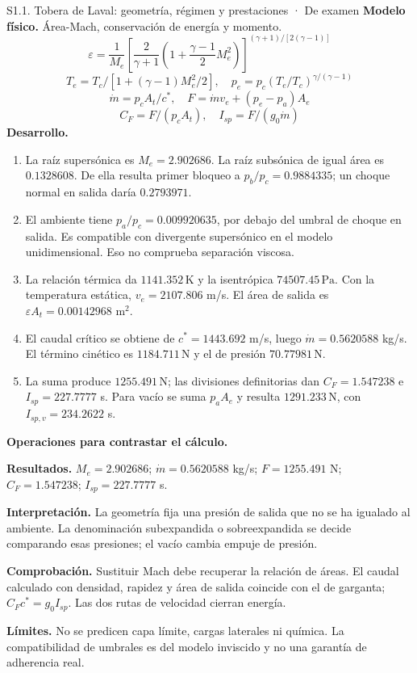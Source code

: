 \begin{studiumworked}{S1.1. Tobera de Laval: geometría, régimen y prestaciones · De examen}
\textbf{Modelo físico.} Área-Mach, conservación de energía y momento.
\[\varepsilon=\frac1{M_e}\left[\frac2{\gamma+1}(1+\frac{\gamma-1}2M_e^2)\right]^{(\gamma+1)/[2(\gamma-1)]}\]
\[T_e=T_c/[1+(\gamma-1)M_e^2/2],\quad p_e=p_c(T_e/T_c)^{\gamma/(\gamma-1)}\]
\[\dot m=p_cA_t/c^*,\quad F=\dot m v_e+(p_e-p_a)A_e\]
\[C_F=F/(p_cA_t),\quad I_{sp}=F/(g_0\dot m)\]
\textbf{Desarrollo.}
\begin{enumerate}
\item La raíz supersónica es $M_e=2.902686$. La raíz subsónica de igual área es $0.1328608$. De ella resulta primer bloqueo a $p_b/p_c=0.9884335$; un choque normal en salida daría $0.2793971$.
\item El ambiente tiene $p_a/p_c=0.009920635$, por debajo del umbral de choque en salida. Es compatible con divergente supersónico en el modelo unidimensional. Eso no comprueba separación viscosa.
\item La relación térmica da $1141.352\,\mathrm{K}$ y la isentrópica $74507.45\,\mathrm{Pa}$. Con la temperatura estática, $v_e=2107.806$ m/s. El área de salida es $\varepsilon A_t=0.00142968$ m$^2$.
\item El caudal crítico se obtiene de $c^*=1443.692$ m/s, luego $\dot m=0.5620588$ kg/s. El término cinético es $1184.711\,\mathrm{N}$ y el de presión $70.77981\,\mathrm{N}$.
\item La suma produce $1255.491\,\mathrm{N}$; las divisiones definitorias dan $C_F=1.547238$ e $I_{sp}=227.7777$ s. Para vacío se suma $p_aA_e$ y resulta $1291.233\,\mathrm{N}$, con $I_{sp,v}=234.2622$ s.
\end{enumerate}
\textbf{Operaciones para contrastar el cálculo.}

\textbf{Resultados.} $M_e=2.902686$; $\dot m=0.5620588$ kg/s; $F=1255.491$ N; $C_F=1.547238$; $I_{sp}=227.7777$ s.

\textbf{Interpretación.} La geometría fija una presión de salida que no se ha igualado al ambiente. La denominación subexpandida o sobreexpandida se decide comparando esas presiones; el vacío cambia empuje de presión.

\textbf{Comprobación.} Sustituir Mach debe recuperar la relación de áreas. El caudal calculado con densidad, rapidez y área de salida coincide con el de garganta; $C_Fc^*=g_0I_{sp}$. Las dos rutas de velocidad cierran energía.

\textbf{Límites.} No se predicen capa límite, cargas laterales ni química. La compatibilidad de umbrales es del modelo inviscido y no una garantía de adherencia real.
\end{studiumworked}
